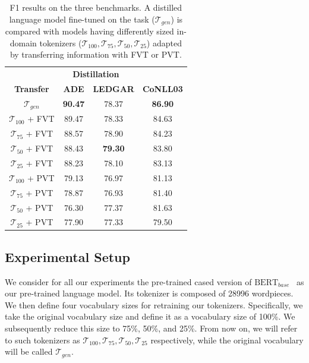 \documentclass[11pt]{article}
\def\tok{\mathcal{T}}
\def\tokgen{\mathcal{T}_{gen}}
\begin{document}
\begin{table}[]
    \begin{tabular}{cccc}
        \hline
        
        \multicolumn{4}{c}{\textbf{Distillation}}\\
        
        \textbf{Transfer} & \textbf{ADE} & \textbf{LEDGAR} & \textbf{CoNLL03}\\ \hline

        $\tokgen$ & \textbf{90.47} & 78.37 & \textbf{86.90}\\ \hline
        
        $\tok_{100}$ + FVT & 89.47 & 78.33          & 84.63\\
        $\tok_{75}$  + FVT & 88.57 & 78.90          & 84.23\\
        $\tok_{50}$  + FVT & 88.43 & \textbf{79.30} & 83.80\\
        $\tok_{25}$  + FVT & 88.23 & 78.10          & 83.13\\ \hline

        $\tok_{100}$ + PVT & 79.13 & 76.97 & 81.13\\
        $\tok_{75}$  + PVT & 78.87 & 76.93 & 81.40\\
        $\tok_{50}$  + PVT & 76.30 & 77.37 & 81.63\\
        $\tok_{25}$  + PVT & 77.90 & 77.33 & 79.50\\ 
        
        \hline             
    \end{tabular} \caption{F1 results on the three benchmarks. A distilled language model fine-tuned on the task ($\tokgen$) is compared with models having differently sized in-domain tokenizers ($\tok_{100},\tok_{75},\tok_{50},\tok_{25}$) adapted by transferring information with FVT or PVT.}\label{tab:distill_f1_results}
\end{table}

\subsection{Experimental Setup}
We consider for all our experiments the pre-trained cased version of $\text{BERT}_{base}$~\cite{bert} as our pre-trained language model. Its tokenizer is composed of 28996 wordpieces.
We then define four vocabulary sizes for retraining our tokenizers. Specifically, we take the original vocabulary size and define it as a vocabulary size of 100\%. We subsequently reduce this size to 75\%, 50\%, and 25\%. From now on, we will refer to such tokenizers as $\tok_{100},\tok_{75},\tok_{50},\tok_{25}$ respectively, while the original vocabulary will be called $\tokgen$.
\end{document}
